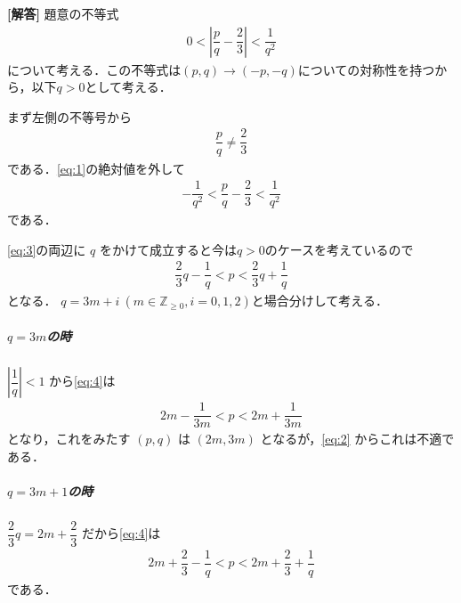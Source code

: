 \documentclass[../../main.tex]{subfiles}
\begin{document}
\begin{oframed}
  
\end{oframed}

{\bf [解答]}
題意の不等式
\begin{align}
  0<\left| \dfrac{p}{q}-\dfrac{2}{3} \right|<\dfrac{1}{q^2} \label{eq:1}
\end{align}
について考える．この不等式は$(p,q) \to (-p,-q)$についての対称性を持つから，以下$q>0$として考える．

まず左側の不等号から
\begin{align}
  \dfrac{p}{q} \neq \dfrac{2}{3} \label{eq:2}
\end{align}
である．\cref{eq:1}の絶対値を外して
\begin{align}
  -\dfrac{1}{q^2} < \dfrac{p}{q} - \dfrac{2}{3} < \dfrac{1}{q^2} \label{eq:3}
\end{align}
である．

\cref{eq:3}の両辺に $q$ をかけて成立すると今は$q>0$のケースを考えているので
\begin{align}
  \dfrac{2}{3}q - \dfrac{1}{q} < p < \dfrac{2}{3}q + \dfrac{1}{q} \label{eq:4}
\end{align}
となる．
$q = 3m+i \ (m \in \mathbb{Z}_{\ge 0}, i=0,1,2)$と場合分けして考える．

\subparagraph{$q = 3m$の時}
$|\dfrac{1}{q}| < 1$ から\cref{eq:4}は
\begin{align}
  2m - \dfrac{1}{3m} < p < 2m + \dfrac{1}{3m}
\end{align}
となり，これをみたす $(p,q)$ は $(2m, 3m)$ となるが，\cref{eq:2} からこれは不適である．

\subparagraph{$q = 3m+1$の時}
$\dfrac{2}{3}q = 2m + \dfrac{2}{3}$ だから\cref{eq:4}は
\begin{align}
  2m + \dfrac{2}{3} - \dfrac{1}{q} < p < 2m + \dfrac{2}{3} + \dfrac{1}{q} \label{eq:5}
\end{align}
である．
\end{document}
